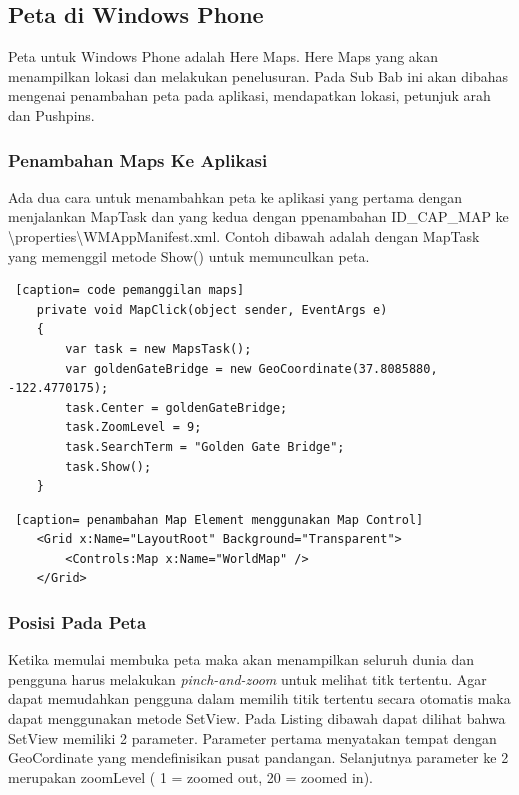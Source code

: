 \subsection{Peta di Windows Phone}
\label{subsec:Peta di Windows Phone}
\hspace{0.5cm} Peta untuk Windows Phone adalah Here Maps. Here Maps yang akan menampilkan lokasi dan melakukan penelusuran. Pada Sub Bab ini akan dibahas mengenai penambahan peta pada aplikasi, mendapatkan lokasi, petunjuk arah dan Pushpins.

\subsubsection{Penambahan Maps Ke Aplikasi}
\label{subsubsec:Penambahan Maps Ke Aplikasi}
\hspace{0.5cm} Ada dua cara untuk menambahkan peta ke aplikasi yang pertama dengan menjalankan MapTask dan yang kedua dengan ppenambahan ID\_CAP\_MAP ke \textbackslash properties\textbackslash WMAppManifest.xml. Contoh dibawah adalah dengan MapTask yang memenggil metode Show() untuk memunculkan peta.

\begin{lstlisting} [caption= code pemanggilan maps]
	private void MapClick(object sender, EventArgs e)
	{
		var task = new MapsTask();
		var goldenGateBridge = new GeoCoordinate(37.8085880, -122.4770175);
		task.Center = goldenGateBridge;
		task.ZoomLevel = 9;
		task.SearchTerm = "Golden Gate Bridge";
		task.Show();
	}
\end{lstlisting}

\begin{lstlisting} [caption= penambahan Map Element menggunakan Map Control]
	<Grid x:Name="LayoutRoot" Background="Transparent">
		<Controls:Map x:Name="WorldMap" />
	</Grid>
\end{lstlisting}

\subsubsection{Posisi Pada Peta}
\label{subsubsec:Posisi Pada Peta}
\hspace{0.5cm} Ketika memulai membuka peta maka akan menampilkan seluruh dunia dan pengguna harus melakukan \textit{pinch-and-zoom} untuk melihat titk tertentu. Agar dapat memudahkan pengguna dalam memilih titik tertentu secara otomatis maka dapat menggunakan metode SetView\(\). Pada Listing dibawah dapat dilihat bahwa SetView\(\) memiliki 2 parameter. Parameter pertama menyatakan tempat dengan GeoCordinate yang mendefinisikan pusat pandangan. Selanjutnya parameter ke 2 merupakan zoomLevel ( 1 = zoomed out, 20 = zoomed in). 


